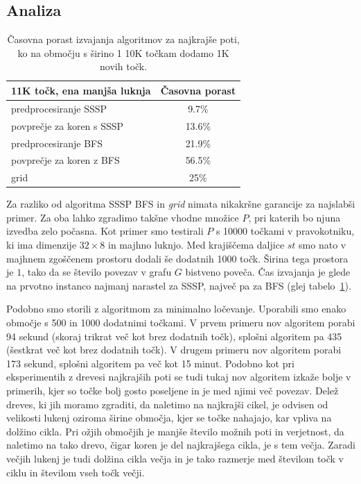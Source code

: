 \documentclass[a4paper, 12pt]{book}
\begin{document}
\subsection{Analiza}
\label{analiza}
\begin{table}[h!]
\begin{center}
\begin{tabular}{l*{1}{c}}
11K točk, ena manjša luknja & \multicolumn{1}{c}{Časovna porast} \\
\hline
predprocesiranje SSSP &	9.7\%		\\
povprečje za koren s SSSP &	13.6\%	\\
predprocesiranje BFS & 21.9\%	\\
povprečje za koren z BFS &	56.5\% \\
grid &	25\%
\end{tabular}
\caption{Časovna porast izvajanja algoritmov za najkrajše poti, ko na območju s širino 1 10K točkam dodamo 1K novih točk.}
\label{table-increase}
\end{center}
\end{table}

Za razliko od algoritma SSSP BFS in \textit{grid} nimata nikakršne garancije za najslabši primer. Za oba lahko zgradimo takšne vhodne množice $P$, pri katerih bo njuna izvedba zelo počasna. Kot primer smo testirali $P$ s 10000 točkami v pravokotniku, ki ima dimenzije $32\times 8$ in majhno luknjo. Med krajiščema daljice $st$ smo nato v majhnem zgoščenem prostoru dodali še dodatnih 1000 točk. Širina tega prostora je $1$, tako da se število povezav v grafu $G$ bistveno poveča. Čas izvajanja je glede na prvotno instanco najmanj narastel za SSSP, največ pa za BFS (glej tabelo~\ref{table-increase}).

Podobno smo storili z algoritmom za minimalno ločevanje. Uporabili smo enako območje s 500 in 1000 dodatnimi točkami. V prvem primeru nov algoritem porabi 94 sekund (skoraj trikrat več kot brez dodatnih točk), splošni algoritem pa 435 (šestkrat več kot brez dodatnih točk). V drugem primeru nov algoritem porabi 173 sekund, splošni algoritem pa več kot 15 minut. Podobno kot pri eksperimentih z drevesi najkrajših poti se tudi tukaj nov algoritem izkaže bolje v primerih, kjer so točke bolj gosto poseljene in je med njimi več povezav. Delež dreves, ki jih moramo zgraditi, da naletimo na najkrajši cikel, je odvisen od velikosti lukenj oziroma širine območja, kjer se točke nahajajo, kar vpliva na dolžino cikla. Pri ožjih območjih je manjše število možnih poti in verjetnost, da naletimo na tako drevo, čigar koren je del najkrajšega cikla, je s tem večja. Zaradi večjih lukenj je tudi dolžina cikla večja in je tako razmerje med številom točk v ciklu in številom vseh točk večji.
\end{document}
